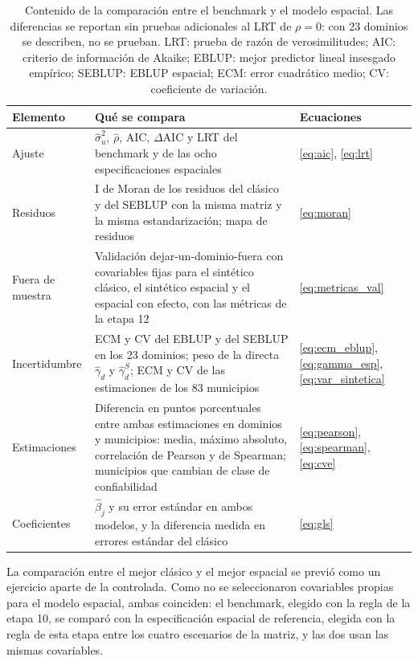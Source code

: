 \begin{table}[!htbp]
\centering
\small
\caption[Contenido de la comparación entre el benchmark y el modelo espacial]{Contenido de la comparación entre el benchmark y el modelo espacial. Las diferencias se reportan sin pruebas adicionales al LRT de $\rho = 0$: con 23 dominios se describen, no se prueban. LRT: prueba de razón de verosimilitudes; AIC: criterio de información de Akaike; EBLUP: mejor predictor lineal insesgado empírico; SEBLUP: EBLUP espacial; ECM: error cuadrático medio; CV: coeficiente de variación.}
\label{tab:met_comparacion}
\renewcommand{\arraystretch}{1.15}
\begin{tabularx}{\linewidth}{>{\raggedright\arraybackslash}p{2.6cm} >{\raggedright\arraybackslash}X >{\raggedright\arraybackslash}p{2.6cm}}
\toprule
Elemento & Qué se compara & Ecuaciones \\
\midrule
Ajuste & $\hat{\sigma}_u^2$, $\hat{\rho}$, AIC, $\Delta$AIC y LRT del benchmark y de las ocho especificaciones espaciales & \ref{eq:aic}, \ref{eq:lrt} \\
Residuos & I de Moran de los residuos del clásico y del SEBLUP con la misma matriz y la misma estandarización; mapa de residuos & \ref{eq:moran} \\
Fuera de muestra & Validación dejar-un-dominio-fuera con covariables fijas para el sintético clásico, el sintético espacial y el espacial con efecto, con las métricas de la etapa 12 & \ref{eq:metricas_val} \\
Incertidumbre & ECM y CV del EBLUP y del SEBLUP en los 23 dominios; peso de la directa $\hat{\gamma}_d$ y $\hat{\gamma}^{S}_d$; ECM y CV de las estimaciones de los 83 municipios & \ref{eq:ecm_eblup}, \ref{eq:gamma_esp}, \ref{eq:var_sintetica} \\
Estimaciones & Diferencia en puntos porcentuales entre ambas estimaciones en dominios y municipios: media, máximo absoluto, correlación de Pearson y de Spearman; municipios que cambian de clase de confiabilidad & \ref{eq:pearson}, \ref{eq:spearman}, \ref{eq:cve} \\
Coeficientes & $\hat{\beta}_j$ y su error estándar en ambos modelos, y la diferencia medida en errores estándar del clásico & \ref{eq:gls} \\
\bottomrule
\end{tabularx}
\end{table}

La comparación entre el mejor clásico y el mejor espacial se previó como un ejercicio aparte de la controlada. Como no se seleccionaron covariables propias para el modelo espacial, ambas coinciden: el benchmark, elegido con la regla de la etapa 10, se comparó con la especificación espacial de referencia, elegida con la regla de esta etapa entre los cuatro escenarios de la matriz, y las dos usan las mismas covariables.

